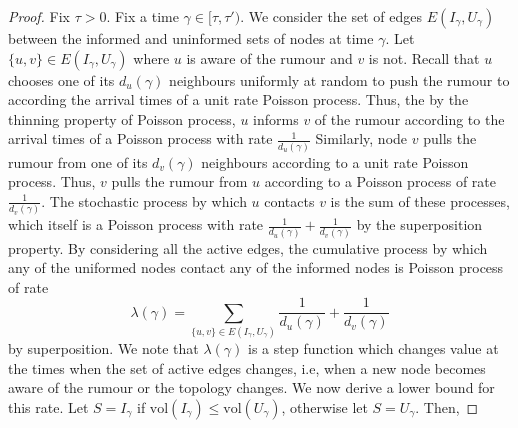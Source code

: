 \begin{proof}
	Fix $\tau > 0$.
	Fix a time $\gamma \in [\tau, \tau')$. 
	We consider the set of edges $E(I_\gamma, U_\gamma)$ between the informed and uninformed sets of nodes at time $\gamma$. 
	Let $\{u, v\} \in E(I_\gamma, U_\gamma)$ where $u$ is aware of the rumour and $v$ is not.
	Recall that $u$ chooses one of its $d_u(\gamma)$ neighbours uniformly at random to push the rumour to according the arrival times of a unit rate Poisson process. Thus, the by the thinning property of Poisson process, $u$ informs $v$ of the rumour according to the arrival times of a Poisson process with rate $\frac{1}{d_u(\gamma)}$
	Similarly, node $v$ pulls the rumour from one of its $d_v(\gamma)$ neighbours according to a unit rate Poisson process. Thus, $v$ pulls the rumour from $u$ according to a Poisson process of rate $\frac{1}{d_v(\gamma)}$.
	The stochastic process by which $u$ contacts $v$ is the sum of these processes, which itself is a Poisson process with rate $\frac{1}{d_u(\gamma)} + \frac{1}{d_v(\gamma)}$ by the superposition property.
	By considering all the active edges, the cumulative process by which any of the uniformed nodes contact any of the informed nodes is Poisson process of rate 
	$$
	\lambda(\gamma) = \sum_{\{u, v\} \in E(I_\gamma, U_\gamma)} \frac{1}{d_u(\gamma)} + \frac{1}{d_v(\gamma)}
	$$
	by superposition. We note that $\lambda(\gamma)$ is a step function which changes value at the times when the set of active edges changes, i.e, when a new node becomes aware of the rumour or the topology changes. We now derive a lower bound for this rate.
	Let $S = I_\gamma$ if $\text{vol}(I_\gamma) \leq \text{vol}(U_\gamma)$, otherwise let $S = U_\gamma$. Then,


\end{proof}
